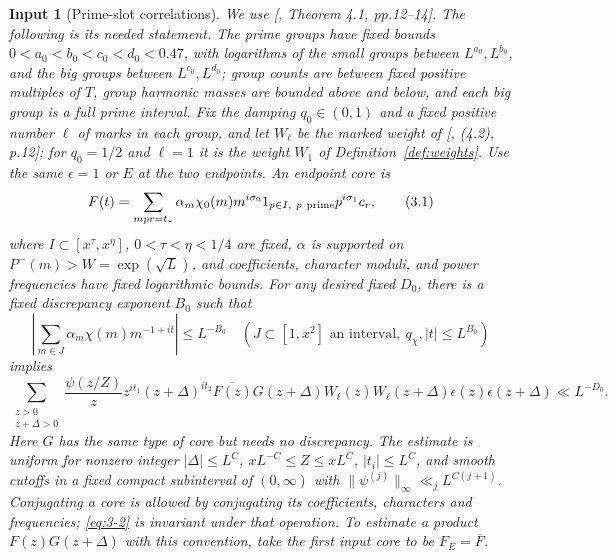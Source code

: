 \documentclass[11pt]{article}
\newtheorem{inputthm}[theorem]{Input}
\theoremstyle{definition}
\theoremstyle{definition}
\begin{document}
\begin{inputthm}[Prime-slot correlations]\label{input:correlation}
We use [, Theorem 4.1, pp.12--14]. The following is its needed statement. The prime groups have fixed bounds
\(0<a_0<b_0<c_0<d_0<0.47\), with logarithms of the small groups between \(L^{a_0},L^{b_0}\), and the big groups between \(L^{c_0},L^{d_0}\); group counts are between fixed positive multiples of \(T\), group harmonic masses are bounded above and below, and each big group is a full prime interval. Fix the damping \(q_0\in(0,1)\) and a fixed positive number \(\ell\) of marks in each group, and let \(W_\ell\) be the marked weight of [, (4.2), p.12]; for \(q_0=1/2\) and \(\ell=1\) it is the weight \(W_1\) of Definition~\ref{def:weights}. Use the same \(\epsilon=1\) or \(E\) at the two endpoints. An endpoint core is
\begin{equation}
F(t)=\sum_{mpr=t_*}\alpha_m\chi_0(m)m^{i\sigma_0}
             1_{p\in I,\ p\ {\rm prime}}p^{i\sigma_1}c_r, \tag{3.1}\label{eq:3-1}
\end{equation}
where \(I\subset[x^\tau,x^\eta]\), \(0<\tau<\eta<1/4\) are fixed, \(\alpha\) is supported on \(P^-(m)>W=\exp(\sqrt L)\), and coefficients, character moduli, and power frequencies have fixed logarithmic bounds. For any desired fixed \(D_0\), there is a fixed discrepancy exponent \(B_0\) such that
\begin{equation}
\left|\sum_{m\in J}\alpha_m\chi(m)m^{-1+it}\right|\le L^{-B_0}
 \quad(J\subset[1,x^2]\text{ an interval},\
                q_\chi,|t|\le L^{B_0})                 \tag{3.2}\label{eq:3-2}
\end{equation}
implies
\begin{equation}
\sum_{\substack{z>0\\z+\Delta>0}}
 \frac{\psi(z/Z)}z z^{it_1}(z+\Delta)^{it_2}
 \overline{F(z)}G(z+\Delta)W_\ell(z)W_\ell(z+\Delta)
                     \epsilon(z)\epsilon(z+\Delta)
 \ll L^{-D_0}.                                        \tag{3.3}\label{eq:3-3}
\end{equation}
Here \(G\) has the same type of core but needs no discrepancy. The estimate is uniform for nonzero integer \(|\Delta|\le L^C\), \(xL^{-C}\le Z\le xL^C\), \(|t_i|\le L^C\), and smooth cutoffs in a fixed compact subinterval of \((0,\infty)\) with
\(\|\psi^{(j)}\|_\infty\ll_j L^{C(j+1)}\). Conjugating a core is allowed by conjugating its coefficients, characters and frequencies; \eqref{eq:3-2} is invariant under that operation. To estimate a product \(F(z)G(z+\Delta)\) with this convention, take the first input core to be \(F_E=\overline F\).

\end{inputthm}
\end{document}
